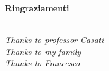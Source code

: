 \thispagestyle{empty}

\begin{center}
  {\bf \Huge Ringraziamenti}
\end{center}

\vspace{4cm}


\emph{\\
  Thanks to professor Casati\\
  Thanks to my family\\
  Thanks to Francesco\\
}
